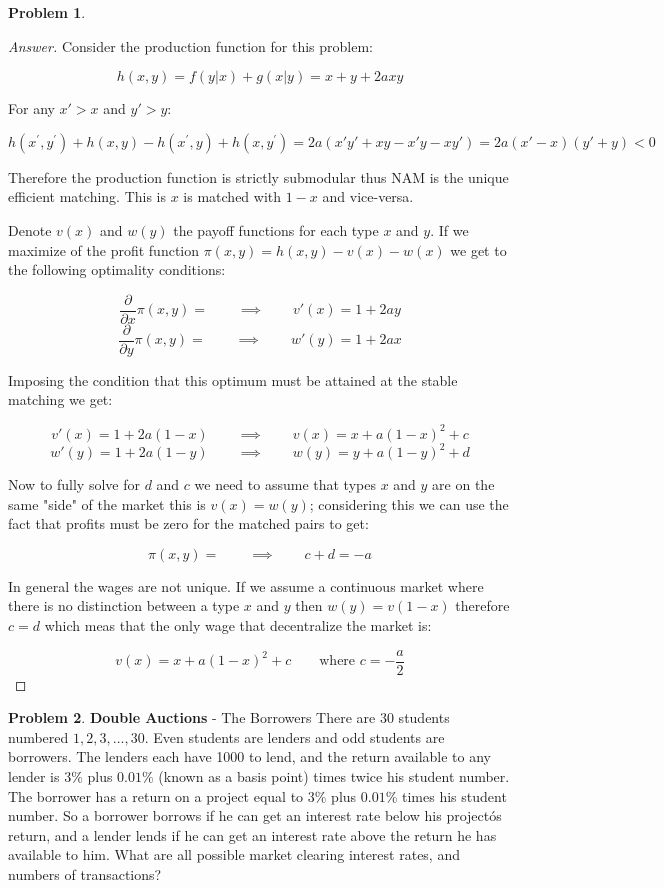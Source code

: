 \documentclass{article}
\theoremstyle{definition}
\newtheorem{problem}{Problem}
\newcommand{\qiq}{\qquad \implies \qquad}
\begin{document}
\begin{problem}
\begin{proof}[Answer]
Consider the production function for this problem:

$$h(x,y)=f(y|x)+g(x|y) = x+y+2axy$$

For any $x'>x$ and $y'>y$:

$$h\left(x^{\prime}, y^{\prime}\right)+h(x, y) - h\left(x^{\prime}, y\right)+h\left(x, y^{\prime}\right) = 2a(x'y'+xy-x'y-xy') = 2a(x'-x)(y'+y)<0$$

Therefore the production function is strictly submodular thus NAM is the  unique efficient matching. This is $x$ is matched with $1-x$ and vice-versa.

Denote $v(x)$ and $w(y)$ the payoff functions for each type $x$ and $y$. If we maximize  of the profit function $\pi(x,y) = h(x,y)-v(x)-w(x)$ we get to the following optimality conditions:

$$\frac{\partial}{\partial x}\pi(x,y) = \qiq v'(x) = 1+2a y$$
$$\frac{\partial}{\partial y}\pi(x,y) = \qiq w'(y) = 1+2a x$$

Imposing the condition that this optimum must be attained at the stable matching we get:

$$v'(x) = 1+2a (1-x) \qiq v(x) = x + a(1-x)^2 + c$$
$$w'(y) = 1+2a (1-y) \qiq w(y) = y + a(1-y)^2 + d$$

Now to fully solve for $d$ and $c$ we need to assume that types $x$ and $y$ are on the same "side" of the market this is $v(x)=w(y)$; considering this we can use the fact that profits must be zero for the matched pairs to get:

$$\pi(x,y) = \qiq c+d = -a$$

In general the wages are not unique. If we assume a continuous market where there is no distinction between a type $x$ and $y$ then $w(y)=v(1-x)$ therefore $c=d$ which meas that the only wage that decentralize the market is:

$$v(x) = x + a(1-x)^2 + c \qquad \text{where } c = -\frac{a}{2}$$

\end{proof}
\end{problem}

\begin{problem}
\textbf{Double Auctions} - The Borrowers There are 30 students numbered $1,2,3, \ldots, 30 .$ Even students are lenders and odd students are borrowers. The lenders each have 1000 to lend, and the return available to any lender is $3 \%$ plus $0.01 \%$ (known as a basis point) times twice his student number. The borrower has a return on a project equal to $3 \%$ plus $0.01 \%$ times his student number. So a borrower borrows if he can get an interest rate below his projectós return, and a lender lends if he can get an interest rate above the return he has available to him. What are all possible market clearing interest rates, and numbers of transactions?
\end{problem}
\end{document}
